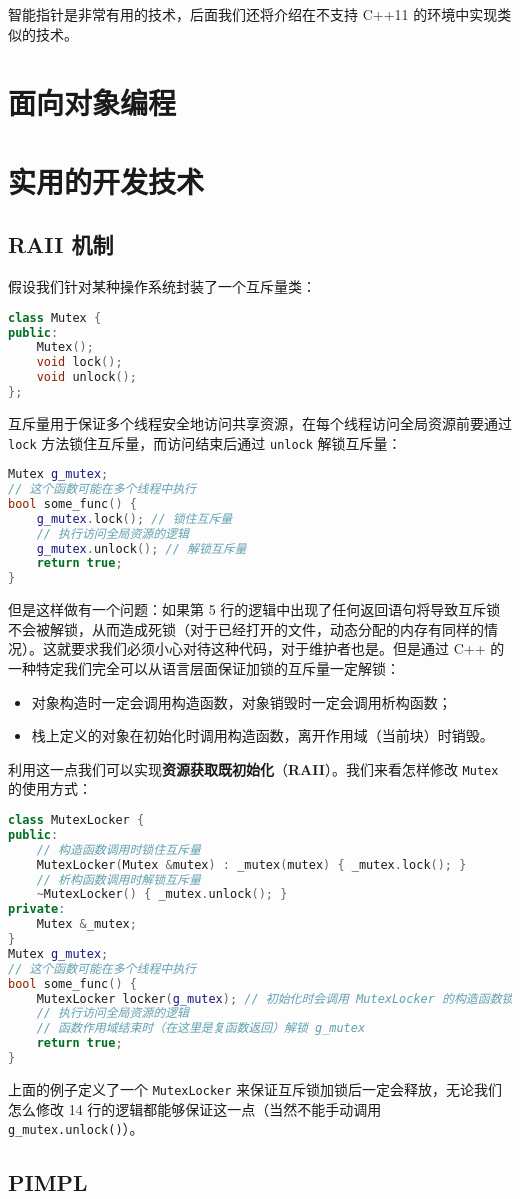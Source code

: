 \documentclass[hyperref,UTF8]{article}
\begin{document}
智能指针是非常有用的技术，后面我们还将介绍在不支持 C++11 的环境中实现类似的技术。

\section{面向对象编程}

\section{实用的开发技术}

\subsection{RAII 机制}

假设我们针对某种操作系统封装了一个互斥量类：
\begin{lstlisting}[language=c++]
class Mutex {
public:
    Mutex();
    void lock();
    void unlock();
};
\end{lstlisting}
互斥量用于保证多个线程安全地访问共享资源，在每个线程访问全局资源前要通过 \texttt{lock} 方法锁住互斥量，而访问结束后通过 \texttt{unlock} 解锁互斥量：
\begin{lstlisting}[language=c++]
Mutex g_mutex;
// 这个函数可能在多个线程中执行
bool some_func() {
    g_mutex.lock(); // 锁住互斥量
    // 执行访问全局资源的逻辑
    g_mutex.unlock(); // 解锁互斥量
    return true;
}
\end{lstlisting}
但是这样做有一个问题：如果第 5 行的逻辑中出现了任何返回语句将导致互斥锁不会被解锁，从而造成死锁（对于已经打开的文件，动态分配的内存有同样的情况）。这就要求我们必须小心对待这种代码，对于维护者也是。但是通过 C++ 的一种特定我们完全可以从语言层面保证加锁的互斥量一定解锁：
\begin{itemize}
  \item 对象构造时一定会调用构造函数，对象销毁时一定会调用析构函数；
  \item 栈上定义的对象在初始化时调用构造函数，离开作用域（当前块）时销毁。
\end{itemize}
利用这一点我们可以实现\textbf{资源获取既初始化}（\textbf{RAII}）。我们来看怎样修改 \texttt{Mutex} 的使用方式：
\begin{lstlisting}[language=c++]
class MutexLocker {
public:
    // 构造函数调用时锁住互斥量
    MutexLocker(Mutex &mutex) : _mutex(mutex) { _mutex.lock(); }
    // 析构函数调用时解锁互斥量
    ~MutexLocker() { _mutex.unlock(); }
private:
    Mutex &_mutex;
}
Mutex g_mutex;
// 这个函数可能在多个线程中执行
bool some_func() {
    MutexLocker locker(g_mutex); // 初始化时会调用 MutexLocker 的构造函数锁住 g_mutex
    // 执行访问全局资源的逻辑
    // 函数作用域结束时（在这里是复函数返回）解锁 g_mutex
    return true;
}
\end{lstlisting}
上面的例子定义了一个 \texttt{MutexLocker} 来保证互斥锁加锁后一定会释放，无论我们怎么修改 14 行的逻辑都能够保证这一点（当然不能手动调用 \texttt{g\_mutex.unlock()}）。

\subsection{PIMPL}


\end{document}
